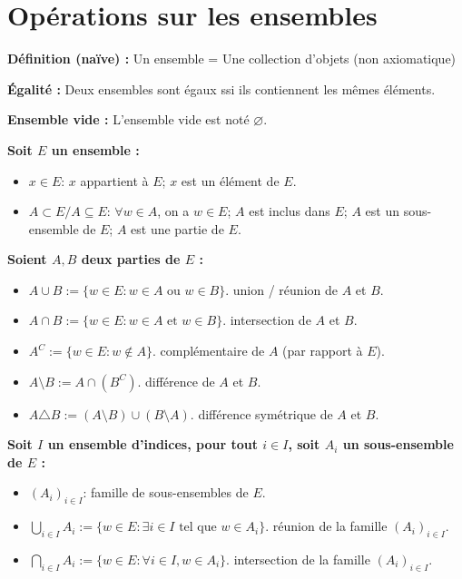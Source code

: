 \section{Opérations sur les ensembles}

\textbf{Définition (naïve) :} Un ensemble = Une collection d'objets (non axiomatique)

\textbf{Égalité :} Deux ensembles sont égaux ssi ils contiennent les mêmes éléments.

\textbf{Ensemble vide :} L'ensemble vide est noté $\varnothing$.

\textbf{Soit $E$ un ensemble :}
\begin{itemize}
    \item $x \in E$: $x$ appartient à $E$; $x$ est un élément de $E$.
    \item $A \subset E / A \subseteq E$: $\forall w \in A$, on a $w \in E$;
          $A$ est inclus dans $E$;
          $A$ est un sous-ensemble de $E$;
          $A$ est une partie de $E$.
\end{itemize}

\textbf{Soient $A, B$ deux parties de $E$ :}
\begin{itemize}
    \item $A \cup B := \{ w \in E: w \in A \text{ ou } w \in B \}$. union / réunion de $A$ et $B$.
    \item $A \cap B := \{ w \in E: w \in A \text{ et } w \in B \}$. intersection de $A$ et $B$.
    \item $A^C := \{ w \in E: w \notin A \}$. complémentaire de $A$ (par rapport à $E$).
    \item $A \setminus B := A \cap (B^C)$. différence de $A$ et $B$.
    \item $A \triangle B := (A \setminus B) \cup (B \setminus A)$. différence symétrique de $A$ et $B$.
\end{itemize}

\textbf{Soit $I$ un ensemble d'indices, pour tout $i \in I$, soit $A_i$ un sous-ensemble de $E$ :}
\begin{itemize}
    \item $(A_i)_{i \in I}$: famille de sous-ensembles de $E$.
    \item $\bigcup\limits_{i \in I} A_i := \{ w \in E: \exists i \in I \text{ tel que } w \in A_i \}$.
          réunion de la famille $(A_i)_{i \in I}$.
    \item $\bigcap\limits_{i \in I} A_i := \{ w \in E: \forall i \in I, w \in A_i \}$.
          intersection de la famille $(A_i)_{i \in I}$.
\end{itemize}


